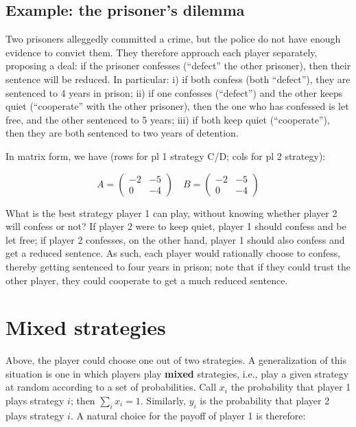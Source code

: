 \documentclass[]{book}
\begin{document}
\hypertarget{example-the-prisoners-dilemma}{%
\subsection{Example: the prisoner's dilemma}\label{example-the-prisoners-dilemma}}

Two prisoners alleggedly committed a crime, but the police do not have enough evidence to convict them. They therefore approach each player separately, proposing a deal: if the prisoner confesses (``defect'' the other prisoner), then their sentence will be reduced. In particular: i) if both confess (both ``defect''), they are sentenced to 4 years in prison; ii) if one confesses (``defect'') and the other keeps quiet (``cooperate'' with the other prisoner), then the one who has confessed is let free, and the other sentenced to 5 years; iii) if both keep quiet (``cooperate''), then they are both sentenced to two years of detention.

In matrix form, we have (rows for pl 1 strategy C/D; cols for pl 2 strategy):

\[
A = \begin{pmatrix}
-2 & -5\\
0 & -4
\end{pmatrix} \quad
B = \begin{pmatrix}
-2 & -5\\
0 & -4
\end{pmatrix}
\]

What is the best strategy player 1 can play, without knowing whether player 2 will confess or not? If player 2 were to keep quiet, player 1 should confess and be let free; if player 2 confesses, on the other hand, player 1 should also confess and get a reduced sentence. As such, each player would rationally choose to confess, thereby getting sentenced to four years in prison; note that if they could trust the other player, they could cooperate to get a much reduced sentence.

\hypertarget{mixed-strategies}{%
\section{Mixed strategies}\label{mixed-strategies}}

Above, the player could choose one out of two strategies. A generalization of this situation is one in which players play \textbf{mixed} strategies, i.e., play a given strategy at random according to a set of probabilities. Call \(x_i\) the probability that player 1 plays strategy \(i\); then \(\sum_i x_i = 1\). Similarly, \(y_i\) is the probability that player 2 plays strategy \(i\). A natural choice for the payoff of player 1 is therefore:
\end{document}
